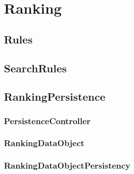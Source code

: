 
\section{Ranking}
\subsection{Rules}
\subsection{SearchRules}
\subsection{RankingPersistence}
\subsubsection{PersistenceController}
\subsubsection{RankingDataObject}
\subsubsection{RankingDataObjectPersistency}

